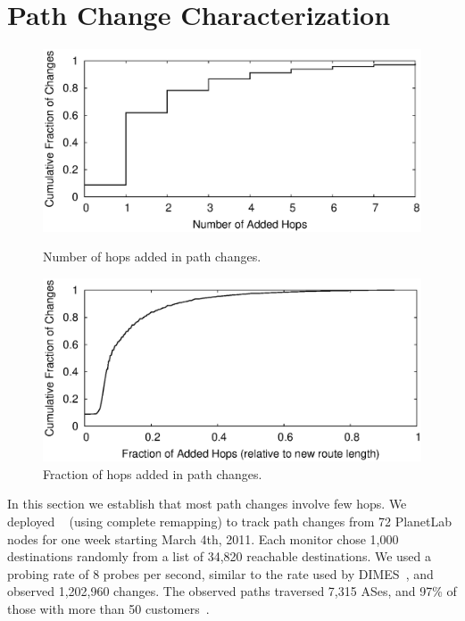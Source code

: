 \section{Path Change Characterization}
\label{sec:char}

\begin{figure}[t]
\includegraphics[width=\columnwidth]{figs/nadded.eps}
\caption{Number of hops added in path changes.}
\label{fig:char.nrouters}

\includegraphics[width=\columnwidth]{figs/fracsadded.eps}
\caption{Fraction of hops added in path changes.}
\label{fig:char.fracs}
\end{figure}

In this section we establish that most path changes involve few hops.
We deployed \dtrack{}~\cite{cunha11dtrack} (using complete remapping) to
track path changes from 72 PlanetLab nodes for one week starting March
4th, 2011.  Each monitor chose 1,000 destinations randomly from a list
of 34,820 reachable destinations.  We used a probing rate of 8 probes per
second, similar to the rate used by DIMES~\cite{shavitt09dimes}, and
observed 1,202,960  changes.  The observed paths traversed 7,315 ASes,
and 97\% of those with more than 50
customers~\cite{luckie13asrel}.\footnotemark{}


